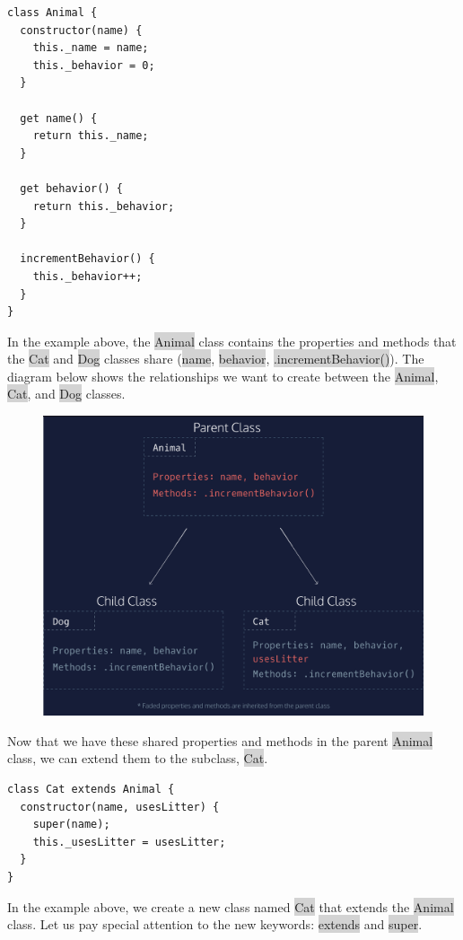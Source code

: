 \documentclass[11pt]{article}
\begin{document}
\begin{lstlisting}
class Animal {
  constructor(name) {
    this._name = name;
    this._behavior = 0;
  }

  get name() {
    return this._name;
  }

  get behavior() {
    return this._behavior;
  }   

  incrementBehavior() {
    this._behavior++;
  }
} 
\end{lstlisting}
In the example above, the \colorbox{lightgray}{Animal} class contains the properties and methods that the \colorbox{lightgray}{Cat} and \colorbox{lightgray}{Dog} classes share (\colorbox{lightgray}{name}, \colorbox{lightgray}{behavior}, \colorbox{lightgray}{.incrementBehavior()}). The diagram below shows the relationships we want to create between the \colorbox{lightgray}{Animal}, \colorbox{lightgray}{Cat}, and \colorbox{lightgray}{Dog} classes.
\begin{figure}[H]
\includegraphics[scale = 0.242]{12_1}
\centering
\end{figure}
Now that we have these shared properties and methods in the parent \colorbox{lightgray}{Animal} class, we can extend them to the subclass, \colorbox{lightgray}{Cat}.
\begin{lstlisting}
class Cat extends Animal {
  constructor(name, usesLitter) {
    super(name);
    this._usesLitter = usesLitter;
  }
}
\end{lstlisting}
In the example above, we create a new class named \colorbox{lightgray}{Cat} that extends the \colorbox{lightgray}{Animal} class. Let us pay special attention to the new keywords: \colorbox{lightgray}{extends} and \colorbox{lightgray}{super}.
\end{document}
